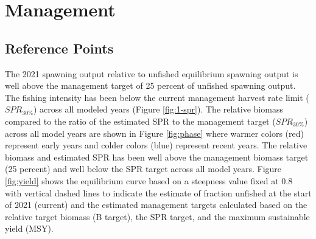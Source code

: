 \documentclass[11pt,
  english,
  a4paper,
]{article}
\begin{document}
\leavevmode\tagmcend\tagstructend\par


\hypertarget{management}{%
\section{Management}\label{management}}

\leavevmode\tagmcend\tagstructend


\hypertarget{reference-points-1}{%
\subsection{Reference Points}\label{reference-points-1}}

\leavevmode\tagmcend\tagstructend


The 2021 spawning output relative to unfished equilibrium spawning output is well above the management target of 25 percent of unfished spawning output. The fishing intensity has been below the current management harvest rate limit ({\(SPR_{30\%}\)\leavevmode\tagmcend\tagstructend}) across all modeled years (Figure \ref{fig:1-spr}). The relative biomass compared to the ratio of the estimated SPR to the management target ({\(SPR_{30\%}\)\leavevmode\tagmcend\tagstructend}) across all model years are shown in Figure \ref{fig:phase} where warmer colors (red) represent early years and colder colors (blue) represent recent years. The relative biomass and estimated SPR has been well above the management biomass target (25 percent) and well below the SPR target across all model years. Figure \ref{fig:yield} shows the equilibrium curve based on a steepness value fixed at 0.8 with vertical dashed lines to indicate the estimate of fraction unfished at the start of 2021 (current) and the estimated management targets calculated based on the relative target biomass (B target), the SPR target, and the maximum sustainable yield (MSY).

\leavevmode\tagmcend\tagstructend\par

\end{document}
